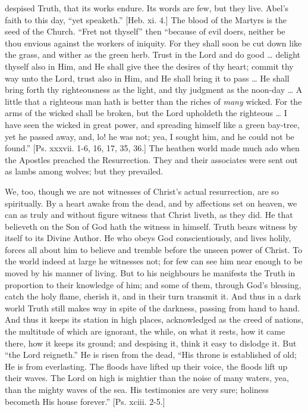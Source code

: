 despised Truth, that its works endure. Its words are few,
but they live. Abel's faith to this day, ``yet
speaketh.'' [Heb. xi. 4.] The blood of the Martyrs is
the seed of the Church. ``Fret not thyself'' then
``because of evil doers, neither be thou envious
against the workers of iniquity. For they shall soon be
cut down like the grass, and wither as the green herb.
Trust in the Lord and do good … delight thyself also
in Him, and He shall give thee the desires of thy heart;
commit thy way unto the Lord, trust also in Him, and He
shall bring it to pass … He shall bring forth thy
righteousness as the light, and thy judgment as the
noon-day … A little that a righteous man hath is
better than the riches of \emph{many} wicked. For the
arms of the wicked shall be broken, but the Lord
upholdeth the righteous … I have seen the wicked in
great power, and spreading himself like a green bay-tree,
yet he passed away, and, lo! he was not; yea, I sought
him, and he could not be found.'' [Ps. xxxvii. 1-6,
16, 17, 35, 36.] The heathen world made much ado when the
Apostles preached the Resurrection. They and their
associates were sent out as lambs among wolves; but they
prevailed.

We, too, though we are not witnesses of Christ's
actual resurrection, are so spiritually. By a heart awake
from the dead, and by affections set on heaven, we can as
truly and without figure witness that Christ liveth, as
they did. He that believeth on the Son of God hath the
witness in himself. Truth bears witness by itself to its
Divine Author. He who obeys God conscientiously, and
lives holily, forces all about him to believe and tremble
before the unseen power of Christ. To the world indeed at
large he witnesses not; for few can see him near enough
to be moved by his manner of living. But to his
neighbours he manifests the Truth in proportion to their
knowledge of him; and some of them, through God's
blessing, catch the holy flame, cherish it, and in their
turn transmit it. And thus in a dark world Truth still
makes way in spite of the darkness, passing from hand to
hand. And thus it keeps its station in high places,
acknowledged as the creed of nations, the multitude of
which are ignorant, the while, on what it rests, how it
came there, how it keeps its ground; and despising it,
think it easy to dislodge it. But ``the Lord
reigneth.'' He is risen from the dead, ``His
throne is established of old; He is from everlasting. The
floods have lifted up their voice, the floods lift up
their waves. The Lord on high is mightier than the noise
of many waters, yea, than the mighty waves of the sea.
His testimonies are very sure; holiness becometh His
house forever.'' [Ps. xciii. 2-5.]

